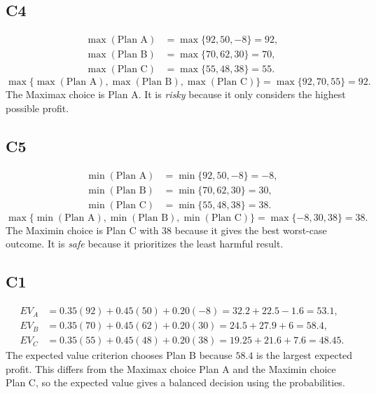 \begin{ExamProblems}
		\subsection*{C4}
		\[
		\begin{aligned}
		\max(\text{Plan A}) &= \max\{92,50,-8\} = 92,\\
		\max(\text{Plan B}) &= \max\{70,62,30\} = 70,\\
		\max(\text{Plan C}) &= \max\{55,48,38\} = 55.
		\end{aligned}
		\]
		\[
		\max\{\max(\text{Plan A}), \max(\text{Plan B}), \max(\text{Plan C})\}
		= \max\{92, 70, 55\}
		= 92.
		\]
		The Maximax choice is Plan A. It is \emph{risky} because it only considers the highest possible profit.

		\subsection*{C5}
		\[
		\begin{aligned}
		\min(\text{Plan A}) &= \min\{92,50,-8\} = -8,\\
		\min(\text{Plan B}) &= \min\{70,62,30\} = 30,\\
		\min(\text{Plan C}) &= \min\{55,48,38\} = 38.
		\end{aligned}
		\]
		\[
		\max\{\min(\text{Plan A}), \min(\text{Plan B}), \min(\text{Plan C})\}
		= \max\{-8, 30, 38\}
		= 38.
		\]
		The Maximin choice is Plan C with 38 because it gives the best worst-case outcome. It is \emph{safe} because it prioritizes the least harmful result.

		\subsection*{C1}
		\[
		\begin{aligned}
		EV_A &= 0.35(92)+0.45(50)+0.20(-8)=32.2+22.5-1.6=53.1,\\
		EV_B &= 0.35(70)+0.45(62)+0.20(30)=24.5+27.9+6=58.4,\\
		EV_C &= 0.35(55)+0.45(48)+0.20(38)=19.25+21.6+7.6=48.45.
		\end{aligned}
		\]
		The expected value criterion chooses Plan B because $58.4$ is the largest expected profit. This differs from the Maximax choice Plan A and the Maximin choice Plan C, so the expected value gives a balanced decision using the probabilities.


\end{ExamProblems}
